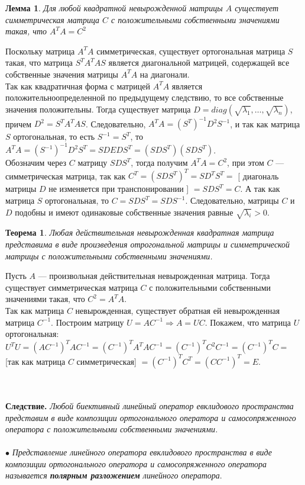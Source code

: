 \newtheorem*{lem14_8_2}{Лемма}\begin{lem14_8_2}Для любой квадратной невырожденной матрицы $A$ существует
	симметрическая матрица $C$ с положительными собственными значениями такая, что $A^TA=C^2$
\end{lem14_8_2}\begin{Proof}
	Поскольку матрица $A^TA$ симметрическая, существует ортогональная матрица $S$ такая, что матрица $S^TA^TAS$ является диагональной матрицей, содержащей все собственные значения матрицы $A^TA$ на диагонали.\\ Так как квадратичная форма с матрицей $A^TA$ является положительноопределенной по предыдущему следствию, то все собственные значения положительны. Тогда существует матрица $D = diag(\sqrt{\lambda_1},\dots,\sqrt{\lambda_n})$, причем $D^2 = S^TA^TAS$. Следовательно, $A^TA = (S^T)^{-1}D^2S^{-1}$, и так как матрица $S$ ортогональная, то есть $S^{-1} = S^T$, то $A^TA = (S^{-1})^{-1}D^2S^T = SDEDS^T = (SDS^T)(SDS^T)$.\\ Обозначим через $C$ матрицу $SDS^T$, тогда получим $A^TA = C^2$, при этом $C$ --- симметрическая матрица, так как $C^T = (SDS^T)^T = SD^TS^T = $ [ диагональ матрицы $D$ не изменяется при транспонировании ] $ = SDS^T = C$. А так как матрица $S$ ортогональная, то $C = SDS^T = SDS^{-1}$. Следовательно, матрицы $C$ и $D$ подобны и имеют одинаковые собственные значения равные $\sqrt{\lambda_i}>0$.
\end{Proof}
\newtheorem*{th14_8}{Теорема}\begin{th14_8}Любая действительная невырожденная квадратная матрица представима в виде произведения отрогональной матрицы и симметрической матрицы с положительными собственными значениями.
\end{th14_8}\begin{Proof}
	Пусть $A$ --- произвольная действительная невырожденная матрица. Тогда существует симметрическая матрица $C$ с положительными собственными значениями такая, что $C^2 = A^TA$.\\Так как матрица $C$ невырожденная, существует обратная ей невырожденная матрица $C^{-1}$. Построим матрицу $U = AC^{-1}\Rightarrow A=UC$. Покажем, что матрица $U$ ортогональная: $U^TU = (AC^{-1})^TAC^{-1}=(C^{-1})^TA^TAC^{-1} = (C^{-1})^TC^2C^{-1} = (C^{-1})^TC = $ [так как матрица $C$ симметрическая] $ = (C^{-1})^TC^T = (CC^{-1})^T = E$.
\end{Proof}\\\\
\textbf{Следствие.} \textit{Любой биективный линейный оператор евклидового пространства представим в виде композиции ортогонального оператора и самосопряженного оператора с положительными собственными значениями.}\\\\
$\bullet$ \textit{Представление линейного оператора евклидового пространства в виде композиции ортогонального оператора и самосопряженного оператора называется \textbf{полярным разложением} линейного оператора}.





